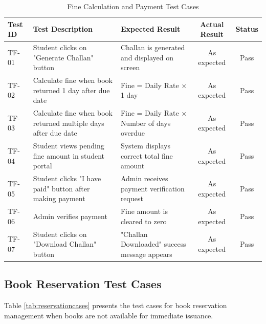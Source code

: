 \documentclass[12pt,a4paper]{report}
\begin{document}
\begin{table}[H]
\centering
\begin{tabularx}{\textwidth}{|l|X|X|c|c|}
\hline
\textbf{Test ID} & \textbf{Test Description} & \textbf{Expected Result} & \textbf{Actual Result} & \textbf{Status} \\
\hline
TF-01 & Student clicks on "Generate Challan" button & Challan is generated and displayed on screen & As expected & Pass \\
\hline
TF-02 & Calculate fine when book returned 1 day after due date & Fine = Daily Rate × 1 day & As expected & Pass \\
\hline
TF-03 & Calculate fine when book returned multiple days after due date & Fine = Daily Rate × Number of days overdue & As expected & Pass \\
\hline
TF-04 & Student views pending fine amount in student portal & System displays correct total fine amount & As expected & Pass \\
\hline
TF-05 & Student clicks "I have paid" button after making payment & Admin receives payment verification request & As expected & Pass \\
\hline
TF-06 & Admin verifies payment & Fine amount is cleared to zero & As expected & Pass \\
\hline
TF-07 & Student clicks on "Download Challan" button & "Challan Downloaded" success message appears & As expected & Pass \\
\hline
\end{tabularx}
\caption{Fine Calculation and Payment Test Cases}
\label{tab:finecases}
\end{table}

\newpage

\subsection{Book Reservation Test Cases}

Table \ref{tab:reservationcases} presents the test cases for book reservation management when books are not available for immediate issuance.

\vspace{0.5cm}
\end{document}
